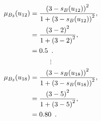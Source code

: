\documentclass[a4paper,openany]{book}
\begin{document}
				\begin{align}
					\mu_{B_3}(u_{12}) &= \frac{\left(3-s_B(u_{12})\right)^2}{1 + \left(3-s_B(u_{12})\right)^2} ,\\
					&= \frac{\left(3-2\right)^2}{1 + \left(3-2\right)^2} \notag ,\\
					&= 0.5 \enspace. \notag
				\end{align}
				\[
					\vdots
				\]
				\begin{align}
					\mu_{B_3}(u_{18}) &= \frac{\left(3-s_B(u_{18})\right)^2}{1 + \left(3-s_B(u_{18})\right)^2} ,\\
					&= \frac{\left(3-5\right)^2}{1 + \left(3-5\right)^2} \notag ,\\
					&= 0.80 \enspace. \notag
				\end{align}
\end{document}
